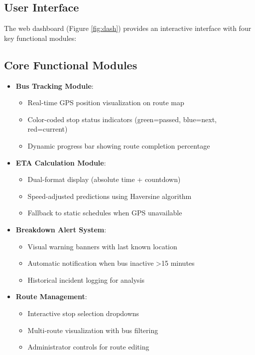 \documentclass{article}
\begin{document}
\begin{multicols}{2}
\section{User Interface}
\vspace{0.5em}
The web dashboard (Figure \ref{fig:dash}) provides an interactive interface with four key functional modules:

\subsection{Core Functional Modules}
\begin{itemize}
\item \textbf{Bus Tracking Module}:
\begin{itemize}
\vspace{0.3em}
\item Real-time GPS position visualization on route map
\item Color-coded stop status indicators (green=passed, blue=next, red=current)
\item Dynamic progress bar showing route completion percentage
\end{itemize}

\vspace{0.5em}
\item \textbf{ETA Calculation Module}:
\begin{itemize}
\vspace{0.3em}
\item Dual-format display (absolute time + countdown)
\item Speed-adjusted predictions using Haversine algorithm
\item Fallback to static schedules when GPS unavailable
\end{itemize}

\vspace{0.5em}
\item \textbf{Breakdown Alert System}:
\begin{itemize}
\vspace{0.3em}
\item Visual warning banners with last known location
\item Automatic notification when bus inactive >15 minutes
\item Historical incident logging for analysis
\end{itemize}

\vspace{0.5em}
\item \textbf{Route Management}:
\begin{itemize}
\vspace{0.3em}
\item Interactive stop selection dropdowns
\item Multi-route visualization with bus filtering
\item Administrator controls for route editing
\end{itemize}
\end{itemize}


\end{multicols}
\end{document}
